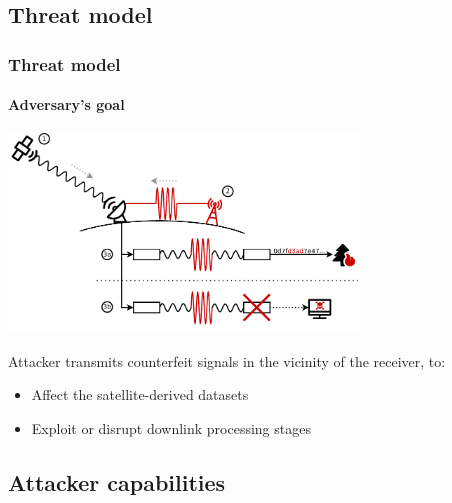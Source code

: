 \documentclass{beamer}
\begin{document}
\subsection{Threat model}
\begin{frame}
  \frametitle{Threat model}
  \framesubtitle{Adversary's goal}

  \begin{center}
    \includegraphics[width=0.7\textwidth]{images/attack_illustration.pdf}
  \end{center}

  Attacker transmits counterfeit signals in the vicinity of the receiver, to:
  \newline
  \begin{itemize}
    \item Affect the satellite-derived datasets
    \item Exploit or disrupt downlink processing stages
  \end{itemize}

\end{frame}

\subsection{Attacker capabilities}
\end{document}
